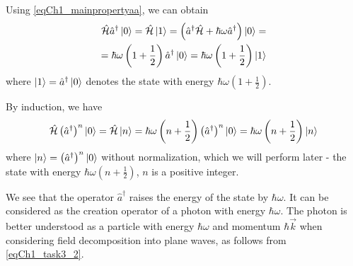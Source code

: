 Using \eqref{eqCh1_mainpropertyaa}, we can obtain
\begin{eqnarray}
\hat{\mathcal{H}} \hat{a}^{\dag}\ket{0} = 
\hat{\mathcal{H}} \ket{1} =
\left(\hat{a}^{\dag} \hat{\mathcal{H}} + \hbar \omega \hat{a}^{\dag} \right)
\ket{0} = 
\nonumber \\
= \hbar \omega \left(1 + \frac{1}{2}\right)
\hat{a}^{\dag} \ket{0} = 
\hbar \omega \left(1 + \frac{1}{2}\right)
\ket{1}
\end{eqnarray}
where $\ket{1} = \hat{a}^{\dag} \ket{0}$ denotes the state with energy $\hbar \omega \left(1 + \frac{1}{2}\right)$.

By induction, we have
\begin{equation}
\hat{\mathcal{H}} \left(\hat{a}^{\dag}\right)^n\ket{0} = 
\hat{\mathcal{H}} \ket{n} 
= \hbar \omega \left(n + \frac{1}{2}\right)
\left(\hat{a}^{\dag}\right)^n\ket{0} = 
\hbar \omega \left(n + \frac{1}{2}\right)
\ket{n}
\label{eqCh1_aplusinduction}
\end{equation}
where
$\ket{n} = \left(\hat{a}^{\dag}\right)^n\ket{0}$   
without normalization, which we will perform later - the state with energy  
$\hbar \omega \left(n + \frac{1}{2}\right)$, $n$ is a positive integer.

We see that the operator $\hat{a}^{\dag}$ raises the energy of the state by $\hbar \omega$. It can be considered as the creation operator of a photon  with energy $\hbar \omega$. The photon is better understood as a particle with energy $\hbar \omega$ and momentum $\hbar \vec{k}$ when considering field decomposition into plane waves, as follows from \eqref{eqCh1_task3_2}. 
  
